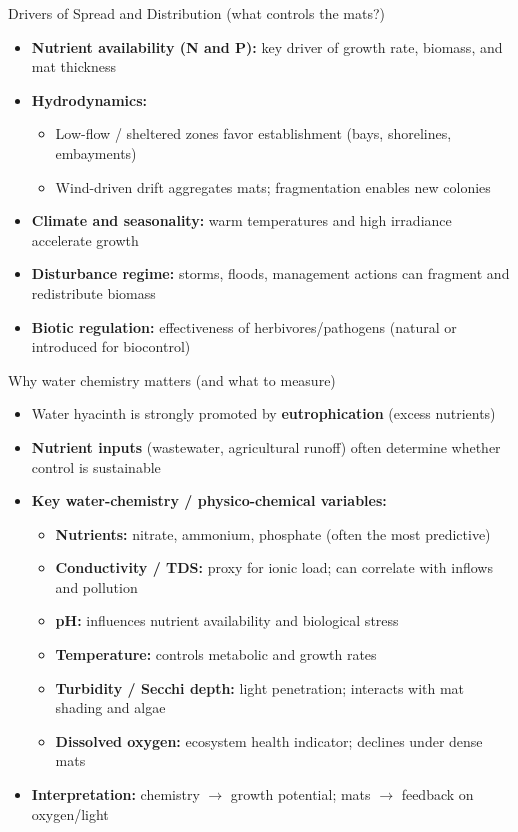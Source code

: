 \begin{frame}{Drivers of Spread and Distribution (what controls the mats?)}
\small
\begin{itemize}
  \item \textbf{Nutrient availability (N and P):} key driver of growth rate, biomass, and mat thickness
  \item \textbf{Hydrodynamics:}
    \begin{itemize}
      \item Low-flow / sheltered zones favor establishment (bays, shorelines, embayments)
      \item Wind-driven drift aggregates mats; fragmentation enables new colonies
    \end{itemize}
  \item \textbf{Climate and seasonality:} warm temperatures and high irradiance accelerate growth
  \item \textbf{Disturbance regime:} storms, floods, management actions can fragment and redistribute biomass
  \item \textbf{Biotic regulation:} effectiveness of herbivores/pathogens (natural or introduced for biocontrol)
\end{itemize}
\end{frame}

\begin{frame}{Why water chemistry matters (and what to measure)}
\small
\begin{itemize}
  \item Water hyacinth is strongly promoted by \textbf{eutrophication} (excess nutrients)
  \item \textbf{Nutrient inputs} (wastewater, agricultural runoff) often determine whether control is sustainable
  \item \textbf{Key water-chemistry / physico-chemical variables:}
    \begin{itemize}
      \item \textbf{Nutrients:} nitrate, ammonium, phosphate (often the most predictive)
      \item \textbf{Conductivity / TDS:} proxy for ionic load; can correlate with inflows and pollution
      \item \textbf{pH:} influences nutrient availability and biological stress
      \item \textbf{Temperature:} controls metabolic and growth rates
      \item \textbf{Turbidity / Secchi depth:} light penetration; interacts with mat shading and algae
      \item \textbf{Dissolved oxygen:} ecosystem health indicator; declines under dense mats
    \end{itemize}
  \item \textbf{Interpretation:} chemistry $\rightarrow$ growth potential; mats $\rightarrow$ feedback on oxygen/light
\end{itemize}
\end{frame}

